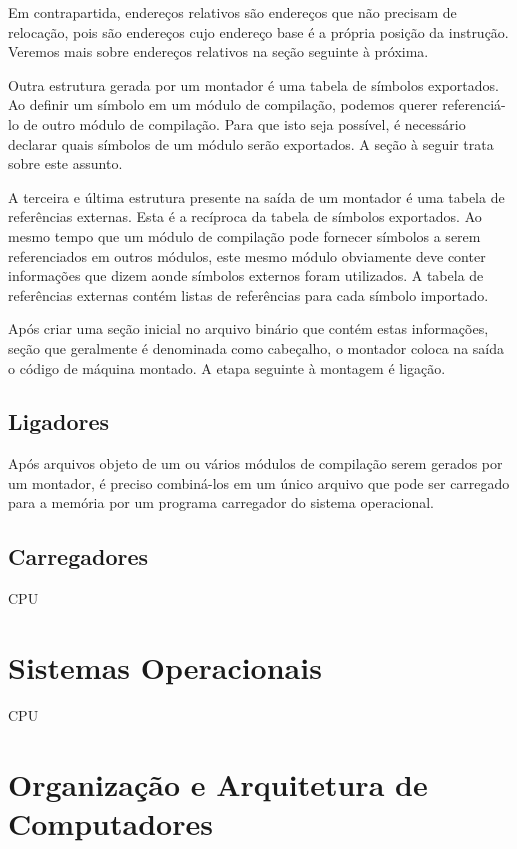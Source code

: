 Em contrapartida, endereços relativos são endereços que não precisam de relocação, pois são endereços cujo endereço base é a própria posição da instrução. Veremos mais sobre endereços relativos na seção seguinte à próxima.

Outra estrutura gerada por um montador é uma tabela de símbolos exportados. Ao definir um símbolo em um módulo de compilação, podemos querer referenciá-lo de outro módulo de compilação. Para que isto seja possível, é necessário declarar quais símbolos de um módulo serão exportados. A seção à seguir trata sobre este assunto.

A terceira e última estrutura presente na saída de um montador é uma tabela de referências externas. Esta é a recíproca da tabela de símbolos exportados. Ao mesmo tempo que um módulo de compilação pode fornecer símbolos a serem referenciados em outros módulos, este mesmo módulo obviamente deve conter informações que dizem aonde símbolos externos foram utilizados. A tabela de referências externas contém listas de referências para cada símbolo importado.

Após criar uma seção inicial no arquivo binário que contém estas informações, seção que geralmente é denominada como cabeçalho, o montador coloca na saída o código de máquina montado. A etapa seguinte à montagem é ligação.

\subsection{Ligadores}

Após arquivos objeto de um ou vários módulos de compilação serem gerados por um montador, é preciso combiná-los em um único arquivo que pode ser carregado para a memória por um programa carregador do sistema operacional.

\subsection{Carregadores}

CPU

\section{Sistemas Operacionais}

CPU

\section{Organização e Arquitetura de Computadores}

